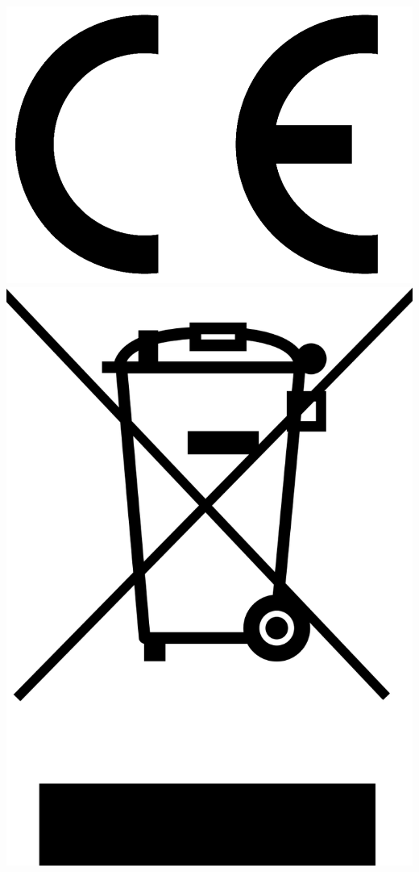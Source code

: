 \documentclass{scrartcl}
\begin{document}
\begin{center}
    \includegraphics[scale=0.10]{assets/ce-logo.png}
    \hspace*{1,5cm}
    \includegraphics[scale=0.05]{assets/weee.png}
\end{center}
\end{document}
